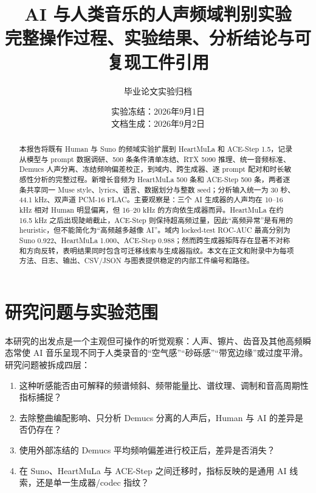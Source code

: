 \documentclass[UTF8,11pt,a4paper,fontset=none]{ctexart}
\title{AI 与人类音乐的人声频域判别实验\\
\large 完整操作过程、实验结果、分析结论与可复现工件引用}
\author{毕业论文实验归档}
\date{实验冻结：2026年9月1日\\文档生成：2026年9月2日}
\begin{document}
\maketitle

\begin{abstract}
本报告将既有 Human 与 Suno 的频域实验扩展到 HeartMuLa 和 ACE-Step 1.5，记录从模型与 prompt 数据调研、500 条条件清单冻结、RTX 5090 推理、统一音频标准、Demucs 人声分离、冻结频响偏差校正，到域内、跨生成器、逐 prompt 配对和时长敏感性分析的完整过程。新增长音频为 HeartMuLa 500 条和 ACE-Step 500 条，两者逐条共享同一 Muse style、lyrics、语言、数据划分与整数 seed；分析输入统一为 30 秒、44.1 kHz、双声道 PCM-16 FLAC。主要观察是：三个 AI 生成器的人声均在 10--16 kHz 相对 Human 明显偏离，但 16--20 kHz 的方向依生成器而异。HeartMuLa 在约 16.5 kHz 之后出现陡峭截止，ACE-Step 则保持超高频过量，因此“高频异常”是有用的 heuristic，但不能简化为“高频越多越像 AI”。域内 locked-test ROC-AUC 最高分别为 Suno 0.922、HeartMuLa 1.000、ACE-Step 0.988；然而跨生成器矩阵存在显著不对称和方向反转，表明结果同时包含可迁移线索与生成器指纹。本文在正文和附录中为每项方法、日志、输出、CSV/JSON 与图表提供稳定的内部工件编号和路径。
\end{abstract}

\noindent{}

\tableofcontents
\listoffigures
\listoftables
\clearpage

\section{研究问题与实验范围}
\label{sec:scope}

本研究的出发点是一个主观但可操作的听觉观察：人声、镲片、齿音及其他高频瞬态常使 AI 音乐呈现不同于人类录音的“空气感”“砂砾感”“带宽边缘”或过度平滑。研究问题被拆成四层：

\begin{enumerate}
  \item 这种听感能否由可解释的频谱倾斜、频带能量比、谱纹理、调制和音高周期性指标捕捉？
  \item 去除整曲编配影响、只分析 Demucs 分离的人声后，Human 与 AI 的差异是否仍存在？
  \item 使用外部冻结的 Demucs 平均频响偏差进行校正后，差异是否消失？
  \item 在 Suno、HeartMuLa 与 ACE-Step 之间迁移时，指标反映的是通用 AI 线索，还是单一生成器/codec 指纹？
\end{enumerate}
\end{document}
